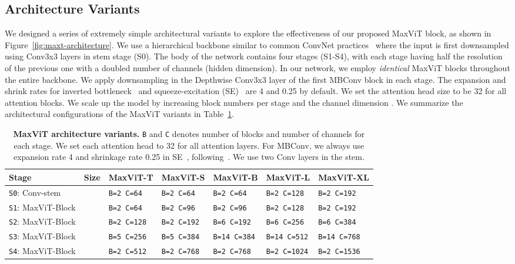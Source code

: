 \documentclass[runningheads]{llncs}
\begin{document}
\subsection{Architecture Variants}
We designed a series of extremely simple architectural variants to explore the effectiveness of our proposed MaxViT block, as shown in Figure~\ref{fig:maxt-architecture}.
We use a hierarchical backbone similar to common ConvNet practices~\cite{he2016deep,liu2022convnet,dai2021coatnet,tan2021efficientnetv2} where the input is first downsampled using Conv3x3 layers in stem stage (S0).
The body of the network contains four stages (S1-S4), with each stage having half the resolution of the previous one with a doubled number of channels (hidden dimension).
In our network, we employ \textit{identical} MaxViT blocks throughout the entire backbone.
We apply downsampling in the Depthwise Conv3x3 layer of the first MBConv block in each stage.
The expansion and shrink rates for inverted bottleneck~\cite{howard2017mobilenets} and squeeze-excitation (SE)~\cite{hu2018squeeze} are 4 and 0.25 by default.
We set the attention head size to be 32 for all attention blocks. We scale up the model by increasing block numbers per stage  and the channel dimension .
We summarize the architectural configurations of the MaxViT variants in Table~\ref{tab:model-variants}.

\begin{table}[!t]
\centering
\footnotesize
\setlength{\tabcolsep}{1.2pt}
\renewcommand{\arraystretch}{1.0}
\caption{\normalsize \textbf{MaxViT architecture variants.} \texttt{B} and \texttt{C} denotes number of blocks and number of channels for each stage. We set each attention head to 32 for all attention layers. For MBConv, we always use expansion rate 4 and shrinkage rate 0.25 in SE~\cite{hu2018squeeze}, following~\cite{tan2019efficientnet,tan2021efficientnetv2,dai2021coatnet}. We use two Conv layers in the stem.}
\label{tab:model-variants}
\begin{tabular}{l|c|l|l|l|l|l}
{Stage} & {Size} & {MaxViT-T} & {MaxViT-S} & { MaxViT-B} & { MaxViT-L} & {MaxViT-XL} \\
\toprule
\texttt{S0}: Conv-stem &  & \texttt{B=2  C=64} & \texttt{B=2 C=64} &  \texttt{B=2 \space  C=64} & \texttt{B=2 \space C=128}  & \texttt{B=2 \space C=192} \\
\texttt{S1}: MaxViT-Block &  & \texttt{B=2  C=64} & \texttt{B=2 C=96} &  \texttt{B=2  \space  C=96} & \texttt{B=2 \space C=128}  & \texttt{B=2 \space C=192} \\
\texttt{S2}: MaxViT-Block &  & \texttt{B=2  C=128} & \texttt{B=2 C=192} &  \texttt{B=6  \space  C=192} & \texttt{B=6 \space C=256}  & \texttt{B=6 \space C=384} \\
\texttt{S3}: MaxViT-Block &  & \texttt{B=5  C=256} & \texttt{B=5 C=384} &  \texttt{B=14  C=384} & \texttt{B=14  C=512}  & \texttt{B=14  C=768} \\
\texttt{S4}: MaxViT-Block &  & \texttt{B=2  C=512} & \texttt{B=2 C=768} &  \texttt{B=2  \space  C=768} & \texttt{B=2 \space C=1024}  & \texttt{B=2 \space C=1536} \\
\end{tabular}
\end{table}
\end{document}
